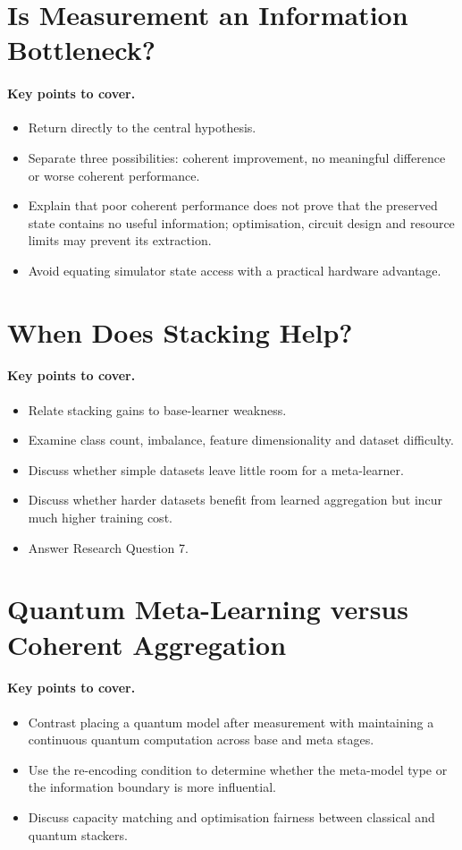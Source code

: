 \documentclass[]{UCD_CS_MSc_AAI_Report}
\newcommand{\sectionbrief}{\paragraph{Key points to cover.}}
\begin{document}
\section{Is Measurement an Information Bottleneck?}
\label{sec:discussion-measurement}

\sectionbrief
\begin{itemize}
    \item Return directly to the central hypothesis.
    \item Separate three possibilities: coherent improvement, no meaningful difference or worse coherent performance.
    \item Explain that poor coherent performance does not prove that the preserved state contains no useful information; optimisation, circuit design and resource limits may prevent its extraction.
    \item Avoid equating simulator state access with a practical hardware advantage.
\end{itemize}

\section{When Does Stacking Help?}
\label{sec:discussion-when}

\sectionbrief
\begin{itemize}
    \item Relate stacking gains to base-learner weakness.
    \item Examine class count, imbalance, feature dimensionality and dataset difficulty.
    \item Discuss whether simple datasets leave little room for a meta-learner.
    \item Discuss whether harder datasets benefit from learned aggregation but incur much higher training cost.
    \item Answer Research Question 7.
\end{itemize}

\section{Quantum Meta-Learning versus Coherent Aggregation}
\label{sec:discussion-meta-vs-coherent}

\sectionbrief
\begin{itemize}
    \item Contrast placing a quantum model after measurement with maintaining a continuous quantum computation across base and meta stages.
    \item Use the re-encoding condition to determine whether the meta-model type or the information boundary is more influential.
    \item Discuss capacity matching and optimisation fairness between classical and quantum stackers.
\end{itemize}
\end{document}
